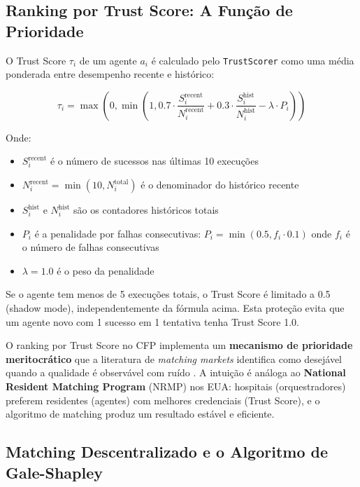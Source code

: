 \subsection{Ranking por Trust Score: A Função de Prioridade}

O Trust Score $\tau_i$ de um agente $a_i$ é calculado pelo \texttt{TrustScorer} como uma média ponderada entre desempenho recente e histórico:

\begin{equation}\label{eq:trust_score}
\tau_i = \max\left(0, \min\left(1, 0.7 \cdot \frac{S_i^{\text{recent}}}{N_i^{\text{recent}}} + 0.3 \cdot \frac{S_i^{\text{hist}}}{N_i^{\text{hist}}} - \lambda \cdot P_i\right)\right)
\end{equation}

Onde:
\begin{itemize}
    \item $S_i^{\text{recent}}$ é o número de sucessos nas últimas 10 execuções
    \item $N_i^{\text{recent}} = \min(10, N_i^{\text{total}})$ é o denominador do histórico recente
    \item $S_i^{\text{hist}}$ e $N_i^{\text{hist}}$ são os contadores históricos totais
    \item $P_i$ é a penalidade por falhas consecutivas: $P_i = \min(0.5, f_i \cdot 0.1)$ onde $f_i$ é o número de falhas consecutivas
    \item $\lambda = 1.0$ é o peso da penalidade
\end{itemize}

Se o agente tem menos de 5 execuções totais, o Trust Score é limitado a 0.5 (shadow mode), independentemente da fórmula acima. Esta proteção evita que um agente novo com 1 sucesso em 1 tentativa tenha Trust Score 1.0.

O ranking por Trust Score no CFP implementa um \textbf{mecanismo de prioridade meritocrático} que a literatura de \textit{matching markets} identifica como desejável quando a qualidade é observável com ruído \cite{roth1990two}. A intuição é análoga ao \textbf{National Resident Matching Program} (NRMP) nos EUA: hospitais (orquestradores) preferem residentes (agentes) com melhores credenciais (Trust Score), e o algoritmo de matching produz um resultado estável e eficiente.

\subsection{Matching Descentralizado e o Algoritmo de Gale-Shapley}

